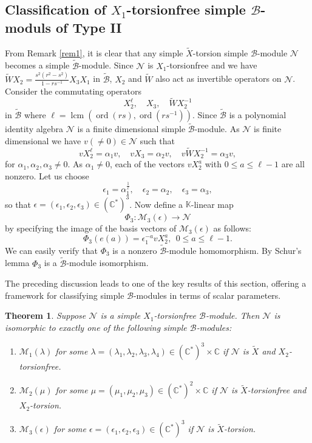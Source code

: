 \documentclass[12 pt,reqno]{amsart}
\numberwithin{equation}{section}
\newcommand{\B}{\mathcal{B}}
\DeclareMathOperator{\ord}{ord}
\newtheorem{thm}{Theorem}[section]
\theoremstyle{definition}
\theoremstyle{definition}
\theoremstyle{remark}
\theoremstyle{remark}
\begin{document}
\subsection{\texorpdfstring{Classification of $X_1$-torsionfree simple $\mathcal{B}$-moduls of Type II}{}} From Remark \ref{rem1}, it is clear that any simple $\tilde{X}$-torsion simple $\mathcal{B}$-module $\mathcal{N}$ becomes a simple $\mathcal{\tilde{B}}$-module. Since $\mathcal{N}$ is $X_1$-torsionfree and we have $ \tilde{W}X_2=\displaystyle\frac{s^2(r^2-s^2)}{1-rs^{-1}}X_3X_1$ in $\mathcal{\tilde{B}}$, $X_2$ and $\tilde{W}$ also act as invertible operators on $\mathcal{N}$. Consider the commutating operators 
\[X_2^{\ell}, \quad X_3,\quad \tilde{W}X_2^{-1}\] in $\mathcal{\tilde{B}}$ where $\ell=\operatorname{lcm}\left(\ord(rs),\ord(rs^{-1})\right)$. Since $\mathcal{\tilde{B}}$ is a polynomial identity algebra $\mathcal{N}$ is a finite dimensional simple $\mathcal{\tilde{B}}$-module. As $\mathcal{N}$ is finite dimensional we have $v(\neq 0)\in \mathcal{N}$ such that 
\[vX_2^{\ell}=\alpha_1v, \quad vX_3=\alpha_2v, \quad v\tilde{W}X_2^{-1}=\alpha_3v,\] for $\alpha_1,\alpha_2,\alpha_3 \neq 0$. As $\alpha_1 \neq 0$, each of the vectors $vX_2^{a}$ with $0 \leq a \leq \ell-1$ are all nonzero. Let us choose 
\[\epsilon_1=\alpha_1^{\frac{1}{\ell}}, \quad \epsilon_2=\alpha_2, \quad \epsilon_3=\alpha_3,\] so that 
$\epsilon=(\epsilon_1,\epsilon_2,\epsilon_3)\in {(\mathbb{C}^*)}^3 $.  Now define a $\mathbb{K}$-linear map \[\Phi_3:\mathcal{M}_3(\epsilon)\rightarrow \mathcal{N}\] by specifying the image of the basis vectors of $\mathcal{M}_3(\epsilon)$ as follows:
\[\Phi_3\left(e(a)\right)=\epsilon_1^{-a}vX_2^a,\ \ 0\leq a\leq \ell-1.\] We can easily verify that $\Phi_3$ is a nonzero $\mathcal{\tilde{B}}$-module homomorphism. By Schur's lemma $\Phi_3$ is a $\mathcal{\tilde{B}}$-module isomorphism.
\par The preceding discussion leads to one of the key results of this section, offering a framework for classifying simple 
$\B$-modules in terms of scalar parameters.
\begin{thm}\label{m3}
    Suppose $\mathcal{N}$ is a simple $X_1$-torsionfree $\B$-module. Then $\mathcal{N}$ is isomorphic to exactly one of the following simple $\B$-modules:
\begin{enumerate}[label= \((\arabic*)\)]
    \item $\mathcal{M}_1(\lambda)$ for some ${\lambda}=(\lambda_1,\lambda_2,\lambda_3, \lambda_4)\in \mathbb{({C}^*)}^3 \times \mathbb{C}$ if $\mathcal{N}$ is $\tilde{X}$ and $X_{2}$-torsionfree.
    \item $\mathcal{M}_2(\mu)$ for some ${\mu}=(\mu_1,\mu_2,\mu_3)\in \mathbb{({C}^*)}^2 \times \mathbb{C}$ if $\mathcal{N}$ is $\tilde{X}$-torsionfree and $X_{2}$-torsion.
    \item $\mathcal{M}_3(\epsilon)$ for some $\epsilon=(\epsilon_1, \epsilon_2, \epsilon_3) \in (\mathbb{C}^{*})^3$  if  $\mathcal{N}$ is $\tilde{X}$-torsion.
\end{enumerate}
\end{thm}
\end{document}
